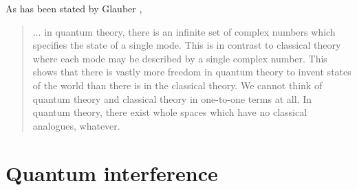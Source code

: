 As
has been stated by Glauber \cite[p. 64]{glauber},
\begin{quote}
$\ldots$ in quantum theory, there is an  infinite set of complex
numbers which
specifies the state of a single mode. This is in contrast to classical
theory where each mode may be described by a  single complex
number. This shows that there is vastly more freedom in quantum theory
to invent states of the world than there is in the classical
theory. We cannot think
of quantum theory and classical theory in one-to-one terms at all. In
quantum theory, there exist whole spaces which have no classical
analogues, whatever.
\end{quote}



\section{Quantum interference}
\label{a:toolbox}

